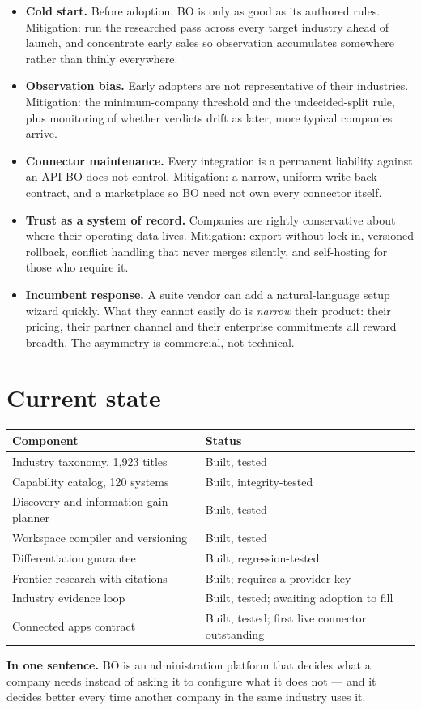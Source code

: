 \documentclass[11pt,a4paper]{article}
\newenvironment{callout}%
{\begin{center}\begin{lrbox}{\calloutbox}\begin{minipage}{\dimexpr0.94\textwidth-24pt\relax}\color{bodark}}%
{\end{minipage}\end{lrbox}\setlength{\fboxsep}{12pt}\colorbox{bosoft}{\usebox{\calloutbox}}\end{center}}
\begin{document}
\begin{itemize}[leftmargin=1.4em,itemsep=3pt]
  \item \textbf{Cold start.} Before adoption, BO is only as good as its authored rules. Mitigation:
        run the researched pass across every target industry ahead of launch, and concentrate early
        sales so observation accumulates somewhere rather than thinly everywhere.
  \item \textbf{Observation bias.} Early adopters are not representative of their industries.
        Mitigation: the minimum-company threshold and the undecided-split rule, plus monitoring of
        whether verdicts drift as later, more typical companies arrive.
  \item \textbf{Connector maintenance.} Every integration is a permanent liability against an API BO
        does not control. Mitigation: a narrow, uniform write-back contract, and a marketplace so BO
        need not own every connector itself.
  \item \textbf{Trust as a system of record.} Companies are rightly conservative about where their
        operating data lives. Mitigation: export without lock-in, versioned rollback, conflict
        handling that never merges silently, and self-hosting for those who require it.
  \item \textbf{Incumbent response.} A suite vendor can add a natural-language setup wizard quickly.
        What they cannot easily do is \emph{narrow} their product: their pricing, their partner
        channel and their enterprise commitments all reward breadth. The asymmetry is commercial,
        not technical.
\end{itemize}

\section{Current state}

\begin{center}
\begin{tabular}{@{}l l@{}}
\toprule
\textbf{Component} & \textbf{Status} \\
\midrule
Industry taxonomy, 1{,}923 titles      & Built, tested \\
Capability catalog, 120 systems        & Built, integrity-tested \\
Discovery and information-gain planner & Built, tested \\
Workspace compiler and versioning      & Built, tested \\
Differentiation guarantee              & Built, regression-tested \\
Frontier research with citations       & Built; requires a provider key \\
Industry evidence loop                 & Built, tested; awaiting adoption to fill \\
Connected apps contract                & Built, tested; first live connector outstanding \\
\bottomrule
\end{tabular}
\end{center}

\vspace{1em}
\begin{callout}
\textbf{In one sentence.} BO is an administration platform that decides what a company needs instead
of asking it to configure what it does not --- and it decides better every time another company in
the same industry uses it.
\end{callout}
\end{document}
